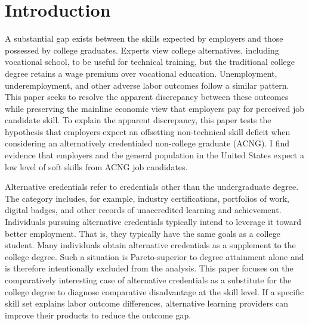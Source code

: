 \documentclass[review]{elsarticle}
\begin{document}
\pagebreak
\linenumbers

\section{Introduction}



A substantial gap exists between the skills expected by employers and those possessed by college graduates\cite{mcgarry2016examination, malik2017great, abbasi2018analysis, gingras2000there}.
Experts view college alternatives,
including vocational school,
to be useful for technical training,
but the traditional college degree retains a wage premium over vocational education.
Unemployment, underemployment, and other adverse labor outcomes follow a similar pattern\cite{smith_2011}.
This paper seeks to resolve the apparent discrepancy between these outcomes while preserving the mainline economic view that employers pay for perceived job candidate skill.
To explain the apparent discrepancy,
this paper tests the hypothesis that employers expect an offsetting non-technical skill deficit when considering an alternatively credentialed non-college graduate (ACNG).
I find evidence that employers and the general population in the United States expect a low level of soft skills from ACNG job candidates.

Alternative credentials refer to credentials other than the undergraduate degree\cite{brown2017complex}.
The category includes, for example,
industry certifications,
portfolios of work,
digital badges, and other records of unaccredited learning and achievement.
Individuals pursuing alternative credentials typically intend to leverage it toward better employment.
That is, they typically have the same goals as a college student.
Many individuals obtain alternative credentials as a supplement to the college degree.
Such a situation is Pareto-superior to degree attainment alone and is therefore intentionally excluded from the analysis.
This paper focuses on the comparatively interesting case of alternative credentials as a substitute for the college degree to diagnose comparative disadvantage at the skill level.
If a specific skill set explains labor outcome differences, alternative learning providers can improve their products to reduce the outcome gap.
\end{document}
